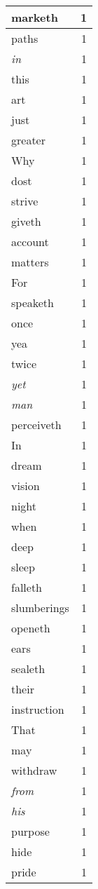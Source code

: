 \begin{center}
\begin{longtable}{l|r}
marketh & 1 \\ \hline
paths & 1 \\ \hline
\emph{in} & 1 \\ \hline
this & 1 \\ \hline
art & 1 \\ \hline
just & 1 \\ \hline
greater & 1 \\ \hline
Why & 1 \\ \hline
dost & 1 \\ \hline
strive & 1 \\ \hline
giveth & 1 \\ \hline
account & 1 \\ \hline
matters & 1 \\ \hline
For & 1 \\ \hline
speaketh & 1 \\ \hline
once & 1 \\ \hline
yea & 1 \\ \hline
twice & 1 \\ \hline
\emph{yet} & 1 \\ \hline
\emph{man} & 1 \\ \hline
perceiveth & 1 \\ \hline
In & 1 \\ \hline
dream & 1 \\ \hline
vision & 1 \\ \hline
night & 1 \\ \hline
when & 1 \\ \hline
deep & 1 \\ \hline
sleep & 1 \\ \hline
falleth & 1 \\ \hline
slumberings & 1 \\ \hline
openeth & 1 \\ \hline
ears & 1 \\ \hline
sealeth & 1 \\ \hline
their & 1 \\ \hline
instruction & 1 \\ \hline
That & 1 \\ \hline
may & 1 \\ \hline
withdraw & 1 \\ \hline
\emph{from} & 1 \\ \hline
\emph{his} & 1 \\ \hline
purpose & 1 \\ \hline
hide & 1 \\ \hline
pride & 1 \\ \hline

\end{longtable}
\end{center}
